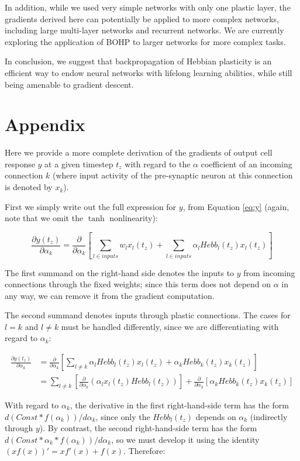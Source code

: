 \documentclass{article}
\begin{document}
In addition, while we used very simple networks with only one plastic layer, the gradients
derived here can potentially be applied to more complex networks, including large
multi-layer networks and recurrent networks. 
We are currently exploring the application of BOHP to larger networks for more complex tasks.

In conclusion, we suggest that backpropagation of Hebbian plasticity is an
efficient 
way to endow neural networks with lifelong learning abilities, while still being
amenable to gradient descent. 

\section*{Appendix}

Here we provide a more complete derivation of the gradients of output cell
response $y$ at a given timestep $t_z$ with regard to the $\alpha$ coefficient
of an incoming connection $k$ (where input activity of the pre-synaptic neuron
at this connection is denoted by $x_k$). 

First we simply write out the
full expression for $y$, from Equation \ref{eq:y} (again, note that we omit
the $\tanh$ nonlinearity):

\[
\frac{\partial y(t_z)}{\partial \alpha_k} = \frac{\partial }{\partial \alpha_k}[ \sum_{l \in inputs}w_l x_l(t_z) + \sum_{l \in inputs}\alpha_l Hebb_l(t_z) x_l(t_z) ] 
\]

The first summand on the right-hand side denotes the inputs to $y$ from incoming connections through the fixed weights; since this term does not depend on $\alpha$ in any way, we can remove it from the gradient computation.

The second summand denotes inputs through plastic connections. The cases for
$l=k$ and $l\neq k$ must be handled differently, since we are differentiating
with regard to $\alpha_k$:

\begin{align}
\frac{\partial y(t_z)}{\partial \alpha_k} &= \frac{\partial }{\partial \alpha_k}[
\sum_{l \neq k }\alpha_l Hebb_l(t_z) x_l(t_z) + \alpha_k Hebb_k(t_z) x_k(t_z)]\\
&= \sum_{l \neq k }[\frac{\partial }{\partial \alpha_k} (\alpha_l x_l(t_z) Hebb_l(t_z))] + \frac{\partial }{\partial \alpha_k}[\alpha_k Hebb_k(t_z) x_k(t_z)]
\end{align}

With regard to $\alpha_k$, the derivative in the first right-hand-side term has the
form $d(Const*f(\alpha_k))/d\alpha_k$, since only the $Hebb_l(t_z)$ depends on $\alpha_k$
(indirectly through $y$). By contrast, the second right-hand-side term has the
form $d(Const*\alpha_k*f(\alpha_k))/d\alpha_k$, so we must develop it using the identity
$(xf(x))'=xf'(x)+f(x)$. Therefore:
\end{document}
